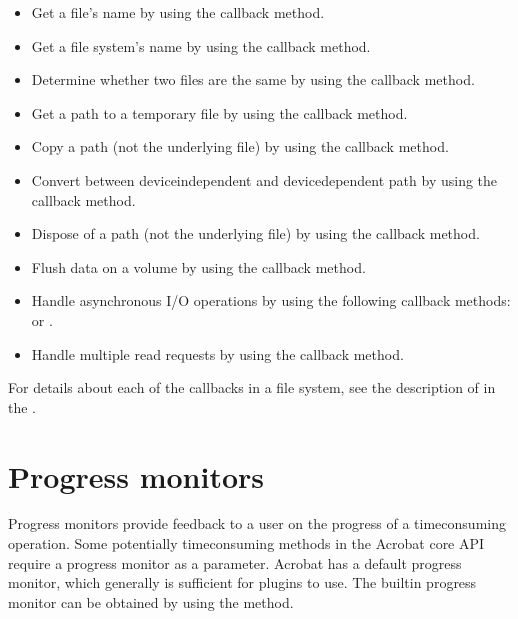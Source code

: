 \documentclass[letterpaper,12pt,english,openany,oneside]{sphinxmanual}
\begin{document}
\begin{itemize}
\item {} 
Get a file’s name by using the  callback method.

\item {} 
Get a file system’s name by using the  callback method.

\item {} 
Determine whether two files are the same by using the  callback method.

\item {} 
Get a path to a temporary file by using the  callback method.

\item {} 
Copy a path (not the underlying file) by using the  callback method.

\item {} 
Convert between device\sphinxhyphen{}independent and device\sphinxhyphen{}dependent path by using the  callback method.

\item {} 
Dispose of a path (not the underlying file) by using the  callback method.

\item {} 
Flush data on a volume by using the  callback method.

\item {} 
Handle asynchronous I/O operations by using the following callback methods:  or .

\item {} 
Handle multiple read requests by using the  callback method.

\end{itemize}

For details about each of the callbacks in a file system, see the description of  in the .


\section{Progress monitors}
\label{\detokenize{Plugins_Handlers:progress-monitors}}
Progress monitors provide feedback to a user on the progress of a time\sphinxhyphen{}consuming operation. Some potentially time\sphinxhyphen{}consuming methods in the Acrobat core API require a progress monitor as a parameter. Acrobat has a default progress monitor, which generally is sufficient for plugins to use. The built\sphinxhyphen{}in progress monitor can be obtained by using the  method.
\end{document}
